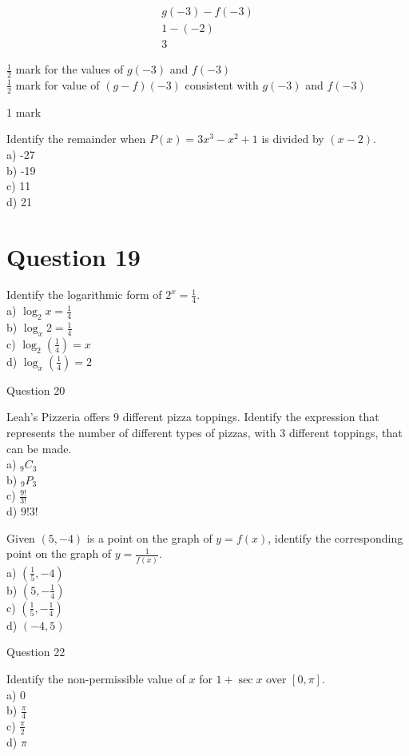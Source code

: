 \documentclass[10pt]{article}
\begin{document}
$$
\begin{gathered}
g(-3)-f(-3) \\
1-(-2) \\
3
\end{gathered}
$$

$\frac{1}{2}$ mark for the values of $g(-3)$ and $f(-3)$\\
$\frac{1}{2}$ mark for value of $(g-f)(-3)$ consistent with $g(-3)$ and $f(-3)$

1 mark

Identify the remainder when $P(x)=3 x^{3}-x^{2}+1$ is divided by $(x-2)$.\\
a) -27\\
b) -19\\
c) 11\\
d) 21

\section*{Question 19}
Identify the logarithmic form of $2^{x}=\frac{1}{4}$.\\
a) $\log _{2} x=\frac{1}{4}$\\
b) $\log _{x} 2=\frac{1}{4}$\\
c) $\log _{2}\left(\frac{1}{4}\right)=x$\\
d) $\log _{x}\left(\frac{1}{4}\right)=2$

Question 20

Leah's Pizzeria offers 9 different pizza toppings. Identify the expression that represents the number of different types of pizzas, with 3 different toppings, that can be made.\\
a) ${ }_{9} C_{3}$\\
b) ${ }_{9} P_{3}$\\
c) $\frac{9!}{3!}$\\
d) $9!3!$

Given $(5,-4)$ is a point on the graph of $y=f(x)$, identify the corresponding point on the graph of $y=\frac{1}{f(x)}$.\\
a) $\left(\frac{1}{5},-4\right)$\\
b) $\left(5,-\frac{1}{4}\right)$\\
c) $\left(\frac{1}{5},-\frac{1}{4}\right)$\\
d) $(-4,5)$

Question 22

Identify the non-permissible value of $x$ for $1+\sec x$ over $[0, \pi]$.\\
a) 0\\
b) $\frac{\pi}{4}$\\
c) $\frac{\pi}{2}$\\
d) $\pi$
\end{document}

